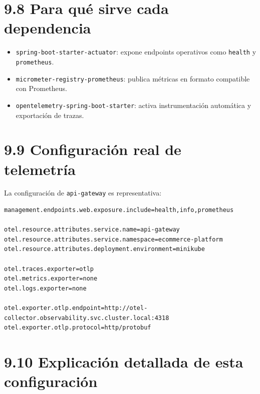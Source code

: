 \documentclass[
a4paper,
12pt]{report}
\providecommand{\tightlist}{%
  \setlength{\itemsep}{0pt}\setlength{\parskip}{0pt}}
\newcounter{none}
\begin{document}
\section{9.8 Para qué sirve cada
dependencia}\label{para-quuxe9-sirve-cada-dependencia}

\begin{itemize}
\tightlist
\item
  \texttt{spring-boot-starter-actuator}: expone endpoints operativos
  como \texttt{health} y \texttt{prometheus}.
\item
  \texttt{micrometer-registry-prometheus}: publica métricas en formato
  compatible con Prometheus.
\item
  \texttt{opentelemetry-spring-boot-starter}: activa instrumentación
  automática y exportación de trazas.
\end{itemize}

\section{9.9 Configuración real de
telemetría}\label{configuraciuxf3n-real-de-telemetruxeda}

La configuración de \texttt{api-gateway} es representativa:

\begin{verbatim}
management.endpoints.web.exposure.include=health,info,prometheus

otel.resource.attributes.service.name=api-gateway
otel.resource.attributes.service.namespace=ecommerce-platform
otel.resource.attributes.deployment.environment=minikube

otel.traces.exporter=otlp
otel.metrics.exporter=none
otel.logs.exporter=none

otel.exporter.otlp.endpoint=http://otel-collector.observability.svc.cluster.local:4318
otel.exporter.otlp.protocol=http/protobuf
\end{verbatim}

\section{9.10 Explicación detallada de esta
configuración}\label{explicaciuxf3n-detallada-de-esta-configuraciuxf3n}
\end{document}
